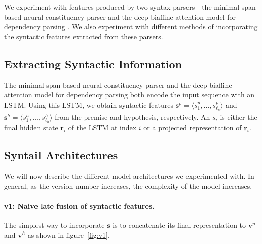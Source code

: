 \documentclass[11pt,a4paper]{article}
\begin{document}
We experiment with features produced by two syntax parsers---the minimal
span-based neural constituency parser \citep{stern2017minimal} and the deep
biaffine attention model for dependency parsing \citep{dozat2016deep}. We also
experiment with different methods of incorporating the syntactic features
extracted from these parsers.

\subsection{Extracting Syntactic Information}

The minimal span-based neural constituency parser and the deep biaffine
attention model for dependency parsing both encode the input sequence with an
LSTM. Using this LSTM, we obtain syntactic features $\bm{s}^p = \langle s^p_1,
\dots, s^p_{\ell_p} \rangle$ and $\bm{s}^h = \langle s^h_1, \dots, s^h_{\ell_h}
\rangle$ from the premise and hypothesis, respectively. An $s_i$ is either the
final hidden state $\bm{r}_i$ of the LSTM at index $i$ or a projected
representation of $\bm{r}_i$.

\subsection{Syntail Architectures}

We will now describe the different model architectures we experimented with.
In general, as the version number increases, the complexity of the model
increases.

\paragraph{v1: Naive late fusion of syntactic features.} The simplest way to
incorporate $\bm{s}$ is to concatenate its final representation to $\bm{v}^p$
and $\bm{v}^h$ as shown in figure~\ref{fig:v1}.
\end{document}
